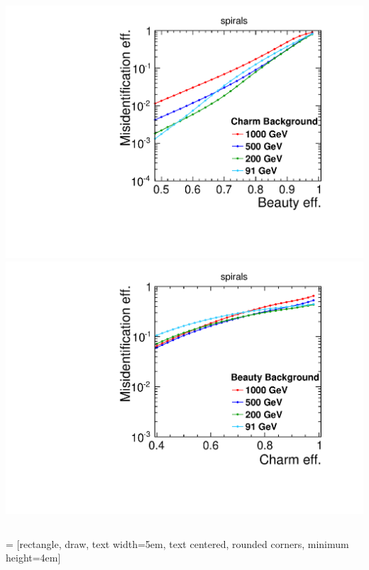 \begin{frame}
  \begin{columns}
    \centering
    \includegraphics[width=\textwidth]{figures/Global_energies_CLIC_SiD_spirals_Beauty_Charm_.pdf}
    \centering
    \includegraphics[width=\textwidth]{figures/Global_energies_CLIC_SiD_spirals_Charm_Beauty_.pdf}
  \end{columns}

\end{frame}


 = [rectangle, draw, text width=5em, text centered, rounded corners, minimum
height=4em]
\usetikzlibrary{backgrounds,fit,decorations.pathreplacing} 


